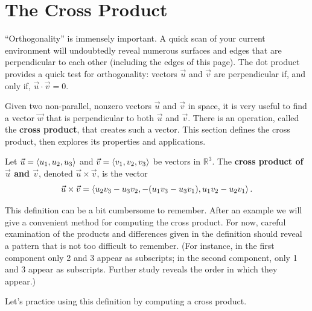 \section{The Cross Product}\label{sec:cross_product}

``Orthogonality'' is immensely important. A quick scan of your current environment will undoubtedly reveal numerous surfaces and edges that are perpendicular to each other (including the edges of this page). The dot product provides a quick test for orthogonality:  vectors $\vec u$ and $\vec v$ are perpendicular if, and only if, $\vec u\cdot\vec v=0$. 

Given two non-parallel, nonzero vectors $\vec u$ and $\vec v$ in space, it is very useful to find a vector $\vec w$ that is perpendicular to both $\vec u$ and $\vec v$. There is an operation, called the \textbf{cross product}, that creates such a vector. This section defines the cross product, then explores its properties and applications.

\begin{definition}\label{def:cross_product}%
Let $\vec u =\left\langle u_1,u_2,u_3\right\rangle$ and $\vec v = \left\langle v_1,v_2,v_3\right\rangle$ be vectors in $\mathbb{R}^3$. The \textbf{cross product of $\vec u$ and $\vec v$}, denoted $\vec u\times\vec v$, is the vector
\[\vec u\times\vec v = \left\langle u_2v_3-u_3v_2,-(u_1v_3-u_3v_1),u_1v_2-u_2v_1\right\rangle.\]
\end{definition}

This definition can be a bit cumbersome to remember. After an example we will give a convenient method for computing the cross product. For now, careful examination of the products and differences given in the definition should reveal a pattern that is not too difficult to remember. (For instance, in the first component only 2 and 3 appear as subscripts; in the second component, only 1 and 3 appear as subscripts. Further study reveals the order in which they appear.)


Let's practice using this definition by computing a cross product.

